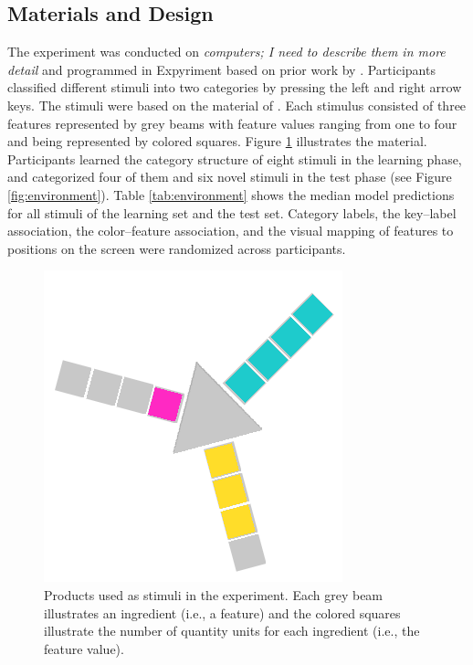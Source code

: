 \documentclass[a4paper,man,natbib]{apa6}
\begin{document}
\subsection{Materials and Design}
The experiment was conducted on \textit{computers; I need to describe them in more detail} and programmed in Expyriment \citep{krause2014expyriment} based on prior work by \cite{albrechtxxxunstacking}. Participants classified different stimuli into two categories by pressing the left and right arrow keys. The stimuli were based on the material of \cite{albrechtxxxunstacking}. Each stimulus consisted of three features represented by grey beams with feature values ranging from one to four and being represented by colored squares. Figure \ref{fig:material} illustrates the material. Participants learned the category structure of eight stimuli in the learning phase, and categorized four of them and six novel stimuli in the test phase (see Figure \ref{fig:environment}). Table \ref{tab:environment} shows the median model predictions for all stimuli of the learning set and the test set. Category labels, the key--label association, the color--feature association, and the visual mapping of features to positions on the screen were randomized across participants.

\begin{figure}[htbp]
\centering
\includegraphics[width = \textwidth]{fig_material.PNG}
\caption{Products used as stimuli in the experiment. Each grey beam illustrates an ingredient (i.e., a feature) and the colored squares illustrate the number of quantity units for each ingredient (i.e., the feature value).}
\label{fig:material}
\end{figure}
\end{document}
